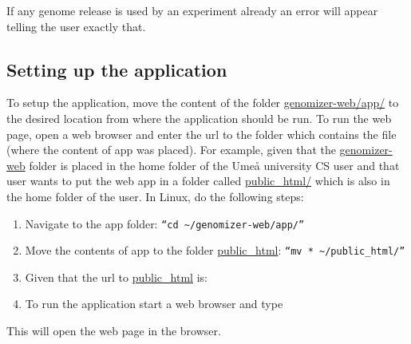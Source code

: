 If any genome release is used by an experiment already an error will appear telling the user exactly that. 

\subsection{Setting up the application}
To setup the application, move the content of the folder \url{genomizer-web/app/} to the desired location from where the application should be run. To run the web page, open a web browser and enter the url to the folder which contains the  file (where the content of app was placed).
For example, given that the \url{genomizer-web} folder is placed in the home folder of the Umeå university CS user  and that user wants to put the web app in a folder called \url{public\_html/} which is also in the home folder of the user. In Linux, do the following steps:
\begin{enumerate}
	\item Navigate to the app folder: \texttt{“cd \textasciitilde /genomizer-web/app/”}
	\item Move the contents of app to the folder \url{public\_html}: \texttt{“mv * \textasciitilde /public\_html/”}
	\item Given that the url to \url{public\_html} is: 
	\item To run the application start a web browser and type 
\end{enumerate}
This will open the web page in the browser.

